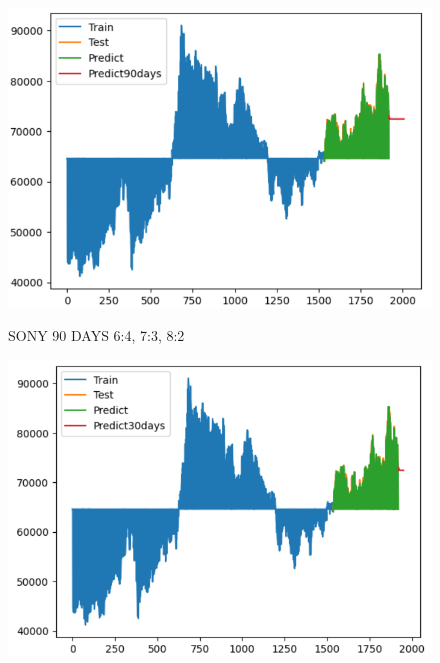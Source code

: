 \documentclass{article}
\begin{document}
\begin{multicols}{2}
\begin{figure}[H]
\begin{minipage}{0.15\textwidth}
    \label{fig:2}
    \end{minipage}%
    \begin{minipage}{0.15\textwidth}
    \centering
    \includegraphics[width=1\textwidth]{Image/XGBoost/SAMSUNG_8_2_90.png}

    \label{fig:3}
    \end{minipage}
    \caption{SONY 90 DAYS  6:4, 7:3, 8:2 }
\end{figure}


\begin{figure}[H]
    \centering
    \begin{minipage}{0.15\textwidth}
    \centering
    \includegraphics[width=1\textwidth]{Image/XGBoost/SAMSUNG_6_4_30.png}
   

\end{minipage}
\end{figure}
\end{multicols}
\end{document}
